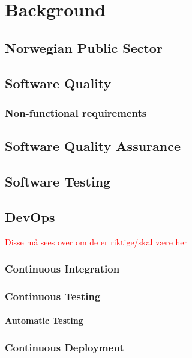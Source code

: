\chapter{Background}

\section{Norwegian Public Sector}

\section{Software Quality}

\subsection{Non-functional requirements}

\section{Software Quality Assurance}

\section{Software Testing}

\section{DevOps}

\textcolor{red}{Disse må sees over om de er riktige/skal være her}
\subsection{Continuous Integration}

\subsection{Continuous Testing}

\subsubsection{Automatic Testing}


\subsection{Continuous Deployment}